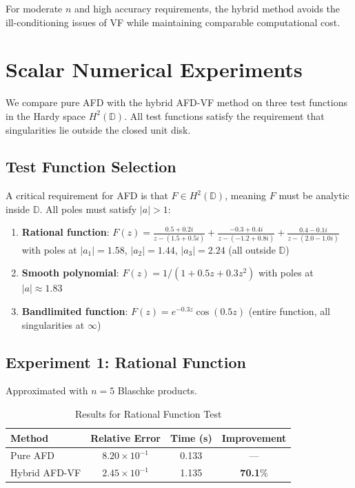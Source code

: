 \documentclass[journal]{IEEEtran}%
\begin{document}
For moderate $n$ and high accuracy requirements, the hybrid method avoids the ill-conditioning issues of VF while maintaining comparable computational cost.

\section{Scalar Numerical Experiments}\label{sec:scalar_experiments}

We compare pure AFD with the hybrid AFD-VF method on three test functions in the Hardy space $H^2(\mathbb{D})$. All test functions satisfy the requirement that singularities lie outside the closed unit disk.

\subsection{Test Function Selection}

A critical requirement for AFD is that $F \in H^2(\mathbb{D})$, meaning $F$ must be analytic inside $\mathbb{D}$. All poles must satisfy $|a| > 1$:

\begin{enumerate}
  \item \textbf{Rational function}: $F(z) = \frac{0.5 + 0.2i}{z - (1.5 + 0.5i)} + \frac{-0.3 + 0.4i}{z - (-1.2 + 0.8i)} + \frac{0.4 - 0.1i}{z - (2.0 - 1.0i)}$ with poles at $|a_1| = 1.58$, $|a_2| = 1.44$, $|a_3| = 2.24$ (all outside $\mathbb{D}$)
  \item \textbf{Smooth polynomial}: $F(z) = 1 / (1 + 0.5z + 0.3z^2)$ with poles at $|a| \approx 1.83$
  \item \textbf{Bandlimited function}: $F(z) = e^{-0.3z}\cos(0.5z)$ (entire function, all singularities at $\infty$)
\end{enumerate}

\subsection{Experiment 1: Rational Function}

Approximated with $n = 5$ Blaschke products.

\begin{table}[h]
\centering
\caption{Results for Rational Function Test}
\begin{tabular}{lccc}
\toprule
Method & Relative Error & Time (s) & Improvement \\
\midrule
Pure AFD & $8.20 \times 10^{-1}$ & 0.133 & --- \\
Hybrid AFD-VF & $2.45 \times 10^{-1}$ & 1.135 & \textbf{70.1}\% \\
\bottomrule
\end{tabular}
\end{table}
\end{document}
